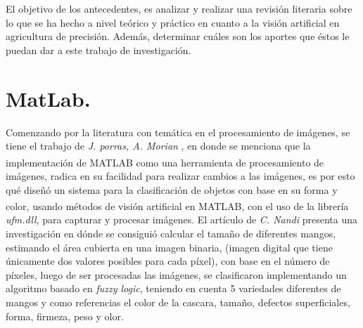 El objetivo de los antecedentes, es analizar y realizar una revisión literaria sobre lo  que  se  ha hecho  a  nivel  teórico  y  práctico  en  cuanto a  la visión artificial en agricultura de precisión.  Además,  determinar  cuáles son los aportes que éstos le puedan dar a este trabajo de investigación.


\section{MatLab.}

Comenzando por la literatura con temática en el procesamiento de imágenes, se tiene el trabajo de \textit{J. porras, A. Morian} \cite{article3}, en donde se menciona que la implementación de MATLAB\textsuperscript{\textregistered} como una herramienta de procesamiento de imágenes, radica en su facilidad para realizar cambios a las imágenes, es por esto qué diseñó un sistema para la clasificación de objetos con base en su forma y color, usando métodos de visión artificial en MATLAB\textsuperscript{\textregistered}, con el uso de la librería \textit{ufm.dll}, para capturar y procesar imágenes. El artículo de \textit{C. Nandi} \cite{inproceedings} presenta una investigación en dónde se consiguió calcular el tamaño de diferentes mangos, estimando el área cubierta en una imagen binaria, (imagen digital que tiene únicamente dos valores posibles para cada píxel), con base en el número de píxeles, luego de ser procesadas las imágenes, se clasificaron implementando un algoritmo basado en \textit{fuzzy logic}, teniendo en cuenta 5 variedades diferentes de mangos y como referencias el color de la cascara, tamaño, defectos superficiales, forma, firmeza, peso y olor.\\

